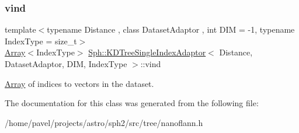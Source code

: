 \subsubsection{\texorpdfstring{vind}{vind}}
{\footnotesize\ttfamily template$<$typename Distance , class Dataset\+Adaptor , int D\+IM = -\/1, typename Index\+Type  = size\+\_\+t$>$ \\
\hyperlink{classArray}{Array}$<$Index\+Type$>$ \hyperlink{classSph_1_1KDTreeSingleIndexAdaptor}{Sph\+::\+K\+D\+Tree\+Single\+Index\+Adaptor}$<$ Distance, Dataset\+Adaptor, D\+IM, Index\+Type $>$\+::vind\hspace{0.3cm}{\ttfamily [protected]}}

\hyperlink{classArray}{Array} of indices to vectors in the dataset. 

The documentation for this class was generated from the following file\+:\begin{DoxyCompactItemize}
\item 
/home/pavel/projects/astro/sph2/src/tree/nanoflann.\+h\end{DoxyCompactItemize}
